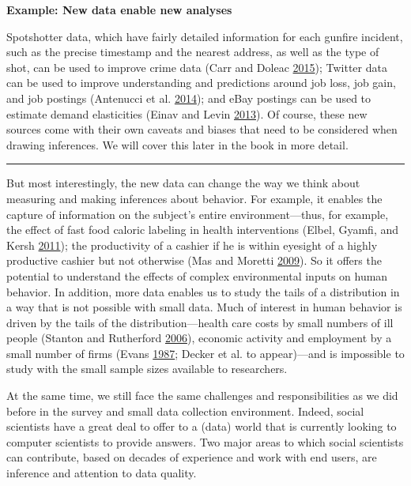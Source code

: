 \documentclass[]{krantz}
\begin{document}
\textbf{Example: New data enable new analyses}

Spotshotter data, which have fairly detailed information for each
gunfire incident, such as the precise timestamp and the nearest address,
as well as the type of shot, can be used to improve crime data (Carr and
Doleac \protect\hyperlink{ref-carr2015geography}{2015}); Twitter data
can be used to improve understanding and predictions around job loss,
job gain, and job postings (Antenucci et al.
\protect\hyperlink{ref-antenucci2014using}{2014}); and eBay postings can
be used to estimate demand elasticities (Einav and Levin
\protect\hyperlink{ref-einav2013data}{2013}). Of course, these new
sources come with their own caveats and biases that need to be
considered when drawing inferences. We will cover this later in the book
in more detail.

\begin{center}\rule{0.5\linewidth}{\linethickness}\end{center}

But most interestingly, the new data can change the way we think about
measuring and making inferences about behavior. For example, it enables
the capture of information on the subject's entire environment---thus,
for example, the effect of fast food caloric labeling in health
interventions (Elbel, Gyamfi, and Kersh
\protect\hyperlink{ref-Elbel2011}{2011}); the productivity of a cashier
if he is within eyesight of a highly productive cashier but not
otherwise (Mas and Moretti \protect\hyperlink{ref-Mas2009}{2009}). So it
offers the potential to understand the effects of complex environmental
inputs on human behavior. In addition, more data enables us to study the
tails of a distribution in a way that is not possible with small data.
Much of interest in human behavior is driven by the tails of the
distribution---health care costs by small numbers of ill people (Stanton
and Rutherford \protect\hyperlink{ref-stanton2006high}{2006}), economic
activity and employment by a small number of firms (Evans
\protect\hyperlink{ref-evans1987tests}{1987}; Decker et al. to
appear)---and is impossible to study with the small sample sizes
available to researchers.

At the same time, we still face the same challenges and responsibilities
as we did before in the survey and small data collection environment.
Indeed, social scientists have a great deal to offer to a (data) world
that is currently looking to computer scientists to provide answers. Two
major areas to which social scientists can contribute, based on decades
of experience and work with end users, are inference and attention to
data quality.
\end{document}
